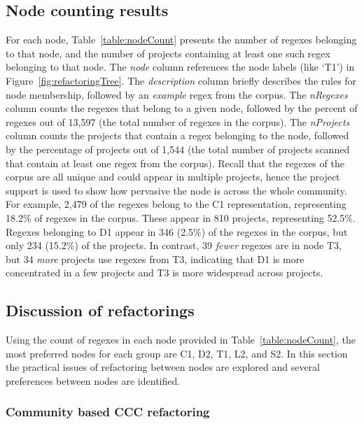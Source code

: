 \subsection{Node counting results}
\label{sec:nodeCountingResults}



For each node, Table~\ref{table:nodeCount} presents the number of regexes belonging to that node, and the number of projects containing at least one such regex belonging to that node. The \emph{node} column references the node labels (like `T1') in Figure~\ref{fig:refactoringTree}.  The \emph{description} column briefly describes the rules for node membership, followed by an \emph{example} regex from the corpus. The \emph{nRegexes} column counts the regexes that belong to a given node, followed by the percent of regexes out of 13,597 (the total number of regexes in the corpus). The \emph{nProjects} column counts the projects that contain a regex belonging to the node, followed by the percentage of projects out of 1,544 (the total number of projects scanned that contain at least one regex from the corpus). Recall that the regexes of the corpus are all unique and could appear in multiple projects, hence the project support is used to show how pervasive the node is across the whole community. For example, 2,479 of the regexes belong to the C1 representation, representing 18.2\% of regexes in the corpus. These appear in 810 projects, representing 52.5\%. Regexes belonging to D1 appear in 346 (2.5\%) of the regexes in the corpus, but only 234 (15.2\%) of the projects. In contrast, 39 \emph{fewer} regexes are in node T3, but 34 \emph{more} projects use regexes from T3, indicating that D1 is more concentrated in a few projects and T3 is more widespread across projects.

\subsection{Discussion of refactorings}
Using the count of regexes in each node provided in Table~\ref{table:nodeCount}, the most preferred nodes for each group are C1, D2, T1, L2, and S2.  In this section the practical issues of refactoring between nodes are explored and several preferences between nodes are identified.

\subsubsection{Community based CCC refactoring}

